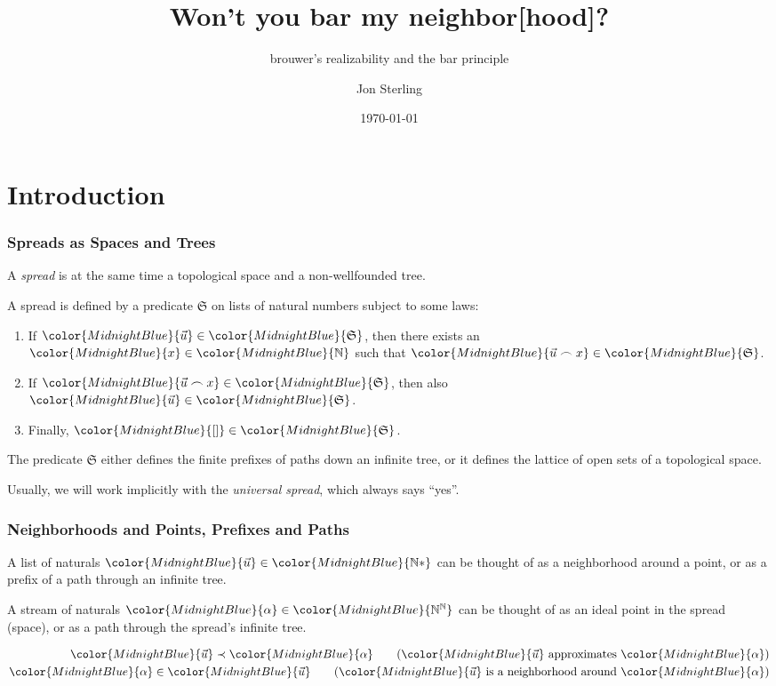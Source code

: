 \documentclass[10pt]{beamer}
\title{Won't you bar my neighbor[hood]?}
\subtitle{brouwer's realizability and the bar principle}
\date{\today}
\institute{SlamData, Inc.}
\author{Jon Sterling}
\def\InputModeColorName{MidnightBlue}
\newcommand\IMode[1]{{\color{\InputModeColorName}{#1}}}
\newcommand\Member[2]{\IMode{#1}\in \IMode{#2}}
\newcommand\Nat{\mathbb{N}}
\begin{document}
\maketitle

\section{Introduction}

\begin{frame}
  \frametitle{Spreads as Spaces and Trees}
  \pause
  A \emph{spread} is at the same time a \alert{topological space} and a \alert{non-wellfounded tree}.

  \medskip

  \pause
  A spread is defined by a predicate $\mathfrak{S}$ on lists of natural numbers subject to some laws:
  \pause
  \begin{enumerate}
    \item If $\Member{\vec{u}}{\mathfrak{S}}$, then there exists an $\Member{x}{\Nat}$ such
      that $\Member{\vec{u}\frown x}{\mathfrak{S}}$.
      \pause
    \item If $\Member{\vec{u}\frown x}{\mathfrak{S}}$, then also $\Member{\vec{u}}{\mathfrak{S}}$.
      \pause
    \item Finally, $\Member{[]}{\mathfrak{S}}$.
  \end{enumerate}

  \medskip
  \pause
  The predicate $\mathfrak{S}$ either defines the finite prefixes of paths down
  an infinite tree, or it defines the lattice of open sets of a topological space.

  \medskip
  \pause

  \alert{Usually, we will work implicitly with the \emph{universal spread}, which always says ``yes''.}

\end{frame}

\begin{frame}
  \frametitle{Neighborhoods and Points, Prefixes and Paths}

  A list of naturals $\Member{\vec{u}}{\Nat*}$ can be thought of as a \alert{neighborhood} around a point, or as a \alert{prefix} of a path through an infinite tree.
  \medskip

  \pause

  A stream of naturals $\Member{\alpha}{\Nat^\Nat}$ can be thought of as an \alert{ideal point} in the spread (space), or as a \alert{path} through the spread's infinite tree.

  \pause

  \begin{align*}
    \IMode{\vec{u}}\prec\IMode{\alpha}
    \tag{$\IMode{\vec{u}}$ approximates $\IMode{\alpha}$}\\
    \Member{\alpha}{\vec{u}}
    \tag{$\IMode{\vec{u}}$ is a neighborhood around $\IMode{\alpha}$}
  \end{align*}
\end{frame}
\end{document}
